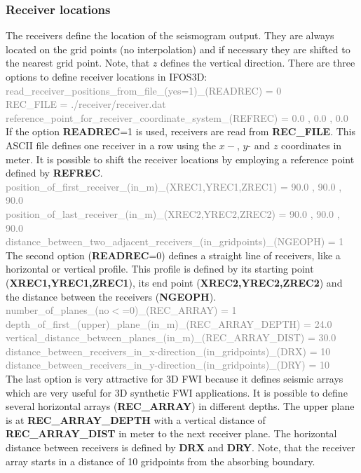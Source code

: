 \subsubsection*{Receiver locations}
The receivers define the location of the seismogram output. They are always located on the grid points (no interpolation) and if necessary they are shifted to the nearest grid point. Note, that $z$ defines the vertical direction. There are three options to define receiver locations in IFOS3D:\vspace{0.3cm}\\
\textcolor {Gray}{read\_receiver\_positions\_from\_file\_(yes=1)\_(READREC) = 0\\
REC\_FILE = ./receiver/receiver.dat\\
reference\_point\_for\_receiver\_coordinate\_system\_(REFREC) = 0.0 , 0.0 , 0.0}\vspace{0.1cm}\\
If the option \textbf{READREC}=1 is used, receivers are read from \textbf{REC\_FILE}. This ASCII file defines one receiver in a row using the $x-$, $y$- and $z$ coordinates in meter. It is possible to shift the receiver locations by employing a reference point defined by \textbf{REFREC}.
\vspace{0.3cm}\\
\textcolor {Gray}{position\_of\_first\_receiver\_(in\_m)\_(XREC1,YREC1,ZREC1) =  90.0 , 90.0 , 90.0\\
position\_of\_last\_receiver\_(in\_m)\_(XREC2,YREC2,ZREC2)  =  90.0 , 90.0 , 90.0\\
distance\_between\_two\_adjacent\_receivers\_(in\_gridpoints)\_(NGEOPH) = 1}\vspace{0.1cm}\\
The second option (\textbf{READREC}=0) defines a straight line of receivers, like a horizontal or vertical profile. This profile is defined by its starting point (\textbf{XREC1,YREC1,ZREC1}), its end point (\textbf{XREC2,YREC2,ZREC2}) and the distance between the receivers (\textbf{NGEOPH}).
\vspace{0.3cm}\\
\textcolor {Gray}{number\_of\_planes\_(no$<$=0)\_(REC\_ARRAY) = 1\\
depth\_of\_first\_(upper)\_plane\_(in\_m)\_(REC\_ARRAY\_DEPTH) = 24.0\\
vertical\_distance\_between\_planes\_(in\_m)\_(REC\_ARRAY\_DIST) = 30.0 \\
distance\_between\_receivers\_in\_x-direction\_(in\_gridpoints)\_(DRX) = 10\\
distance\_between\_receivers\_in\_y-direction\_(in\_gridpoints)\_(DRY) = 10}\vspace{0.1cm}\\
The last option is very attractive for 3D FWI because it defines seismic arrays which are very useful for 3D synthetic FWI applications. It is possible to define several horizontal arrays (\textbf{REC\_ARRAY}) in different depths. The upper plane is at \textbf{REC\_ARRAY\_DEPTH} with a vertical distance of \textbf{REC\_ARRAY\_DIST} in meter to the next receiver plane. The horizontal distance between receivers is defined by \textbf{DRX} and \textbf{DRY}. Note, that the receiver array starts in a distance of 10 gridpoints from the absorbing boundary.
